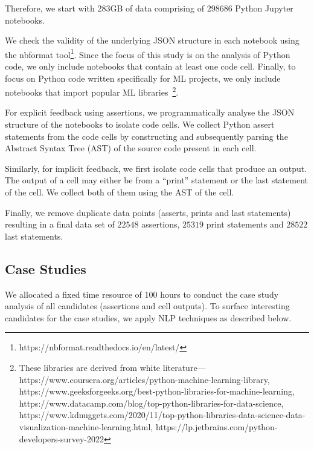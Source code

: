 Therefore, we start with 283GB of data comprising of $298686$ Python Jupyter notebooks.

We check the validity of the underlying JSON structure in each notebook using the nbformat tool\footnote{https://nbformat.readthedocs.io/en/latest/}. Since the focus of this study is on the analysis of Python code, we only include notebooks that contain at least one code cell. Finally, to focus on Python code written specifically for ML projects, we only include notebooks that import popular ML libraries~\footnote{These libraries are derived from white literature---https://www.coursera.org/articles/python-machine-learning-library, https://www.geeksforgeeks.org/best-python-libraries-for-machine-learning, https://www.datacamp.com/blog/top-python-libraries-for-data-science, https://www.kdnuggets.com/2020/11/top-python-libraries-data-science-data-visualization-machine-learning.html, https://lp.jetbrains.com/python-developers-survey-2022}.

For explicit feedback using assertions, we programmatically analyse the JSON structure of the notebooks to isolate code cells. We collect Python assert statements from the code cells by constructing and subsequently parsing the Abstract Syntax Tree (AST) of the source code present in each cell.

Similarly, for implicit feedback, we first isolate code cells that produce an output. The output of a cell may either be from a ``print'' statement or the last statement of the cell. We collect both of them using the AST of the cell.

Finally, we remove duplicate data points (asserts, prints and last statements) resulting in a final data set of $22548$ assertions, $25319$ print statements and $28522$ last statements.

\subsection{Case Studies}


We allocated a fixed time resource of 100 hours to conduct the case study analysis of all candidates (assertions and cell outputs). To surface interesting candidates for the case studies, we apply NLP techniques as described below.


